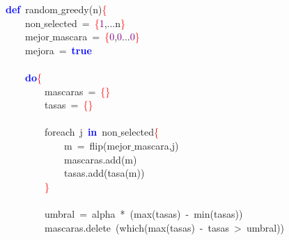 \noindent
\mbox{}\textbf{\textcolor{Blue}{def}}\ random$\_$greedy\textcolor{BrickRed}{(}n\textcolor{BrickRed}{)}\textcolor{Red}{\{} \\
\mbox{}\ \ \ \ non$\_$selected\ \textcolor{BrickRed}{=}\ \textcolor{Red}{\{}\textcolor{Purple}{1}\textcolor{BrickRed}{,...}n\textcolor{Red}{\}} \\
\mbox{}\ \ \ \ mejor$\_$mascara\ \textcolor{BrickRed}{=}\ \textcolor{Red}{\{}\textcolor{Purple}{0}\textcolor{BrickRed}{,}\textcolor{Purple}{0}\textcolor{BrickRed}{...}\textcolor{Purple}{0}\textcolor{Red}{\}} \\
\mbox{}\ \ \ \ mejora\ \textcolor{BrickRed}{=}\ \textbf{\textcolor{Blue}{true}} \\
\mbox{} \\
\mbox{}\ \ \ \ \textbf{\textcolor{Blue}{do}}\textcolor{Red}{\{} \\
\mbox{}\ \ \ \ \ \ \ \ mascaras\ \textcolor{BrickRed}{=}\ \textcolor{Red}{\{\}} \\
\mbox{}\ \ \ \ \ \ \ \ tasas\ \textcolor{BrickRed}{=}\ \textcolor{Red}{\{\}} \\
\mbox{} \\
\mbox{}\ \ \ \ \ \ \ \ foreach\ j\ \textbf{\textcolor{Blue}{in}}\ non$\_$selected\textcolor{Red}{\{} \\
\mbox{}\ \ \ \ \ \ \ \ \ \ \ \ m\ \textcolor{BrickRed}{=}\ flip\textcolor{BrickRed}{(}mejor$\_$mascara\textcolor{BrickRed}{,}j\textcolor{BrickRed}{)} \\
\mbox{}\ \ \ \ \ \ \ \ \ \ \ \ mascaras\textcolor{BrickRed}{.}add\textcolor{BrickRed}{(}m\textcolor{BrickRed}{)} \\
\mbox{}\ \ \ \ \ \ \ \ \ \ \ \ tasas\textcolor{BrickRed}{.}add\textcolor{BrickRed}{(}tasa\textcolor{BrickRed}{(}m\textcolor{BrickRed}{))} \\
\mbox{}\ \ \ \ \ \ \ \ \textcolor{Red}{\}} \\
\mbox{} \\
\mbox{}\ \ \ \ \ \ \ \ umbral\ \textcolor{BrickRed}{=}\ alpha\ \textcolor{BrickRed}{*}\ \textcolor{BrickRed}{(}max\textcolor{BrickRed}{(}tasas\textcolor{BrickRed}{)}\ \textcolor{BrickRed}{-}\ min\textcolor{BrickRed}{(}tasas\textcolor{BrickRed}{))} \\
\mbox{}\ \ \ \ \ \ \ \ mascaras\textcolor{BrickRed}{.}delete\ \textcolor{BrickRed}{(}which\textcolor{BrickRed}{(}max\textcolor{BrickRed}{(}tasas\textcolor{BrickRed}{)}\ \textcolor{BrickRed}{-}\ tasas\ \textcolor{BrickRed}{\textgreater{}}\ umbral\textcolor{BrickRed}{))} \\
